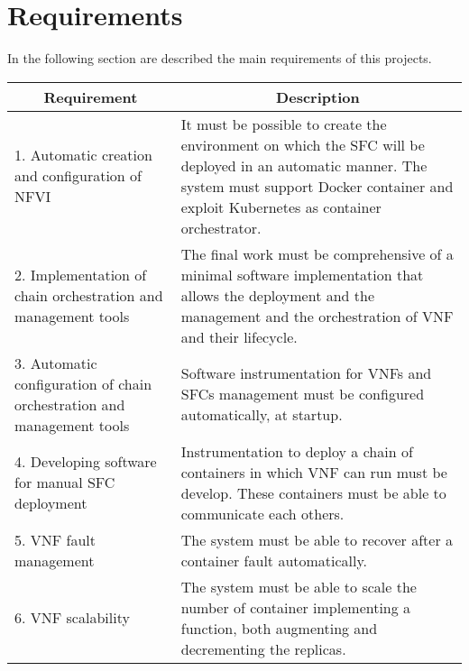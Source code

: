 \section{Requirements}\label{chap:prjan:sec:req}
In the following section are described the main requirements of this projects.

\begin{longtable}[c]{p{}p{}}
\hline
\multicolumn{1}{c}{\textbf{Requirement}}                                & \multicolumn{1}{c}{\textbf{Description}}                                                                                                                                                       \\ \hline
\endhead
%
\hline
\endfoot
%
\endlastfoot
%
1. Automatic creation and configuration of NFVI                         & It must be possible to create the environment on which the SFC will be deployed in an automatic manner. The system must support Docker container and exploit Kubernetes as container orchestrator. \\
2. Implementation of chain orchestration and management tools           & The final work must be comprehensive of a minimal software implementation that allows the deployment and the management and the orchestration of VNF and their lifecycle.                      \\
3. Automatic configuration of chain orchestration and management tools & Software instrumentation for VNFs and SFCs management must be configured automatically, at startup.                                                                                              \\
4. Developing software for manual SFC deployment                        & Instrumentation to deploy a chain of containers in which VNF can run must be develop. These containers must be able to communicate each others.                                                \\
5. VNF fault management                                                 & The system must be able to recover after a container fault automatically.                                                                                                                      \\
6. VNF scalability                                                      & The system must be able to scale the number of container implementing a function, both augmenting and decrementing the replicas.                                                               \\

\end{longtable}
